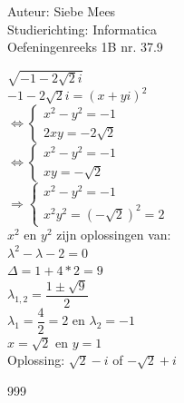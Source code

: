 \documentclass[a4paper]{article}
\begin{document}
  
\noindent \large Auteur: Siebe Mees \\
\noindent \large Studierichting: Informatica\\
\noindent \large Oefeningenreeks 1B nr. 37.9\\

\medskip

\normalsize

$ \sqrt{-1-2\sqrt{2}i} $\\

$ -1 - 2\sqrt{2}i = (x + yi)^2 $\\

$\Leftrightarrow \left \{
\begin{array}{l}
    x^2 - y^2 = -1 \\
    2xy = -2\sqrt{2}
\end{array}
\right .$\\

$\Leftrightarrow \left \{
\begin{array}{l}
    x^2 - y^2 = -1 \\
    xy = -\sqrt{2}
\end{array}
\right .$\\

$\Rightarrow \left \{
\begin{array}{l}
    x^2 - y^2 = -1 \\
    x^2y^2 = (-\sqrt{2})^2 = 2
\end{array}
\right .$\\

$x^2$ en $y^2$ zijn oplossingen van:\\

$ \lambda^2 - \lambda - 2 = 0 $\\

$ \Delta = 1 + 4 * 2 = 9 $\\

$ \lambda_{1,2} = \dfrac{1 \pm \sqrt{9}}{2} $\\

$ \lambda_1 = \dfrac{4}{2}=2 $ en $ \lambda_2 = -1 $\\

$ x = \sqrt{2} $ en $ y = 1 $\\

Oplossing: $ \sqrt{2} - i $ of $ -\sqrt{2} + i $

\begin{thebibliography}{999}

\end{thebibliography}
\end{document}
